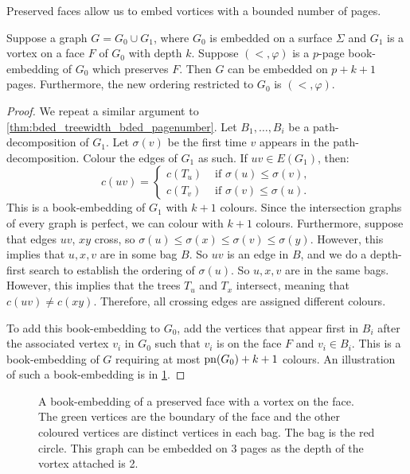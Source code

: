 Preserved faces allow us to embed vortices with a bounded number of pages. 

\begin{lemma}\label{lem:preserved_faces_pagenumber}
	Suppose a graph \(G = G_0 \cup G_1\), where \(G_0\) is embedded on a surface $\Sigma$ and \(G_1\) is a vortex on a face $F$ of $G_0$ with depth \(k\). Suppose $(<, \varphi)$ is a $p$-page book-embedding of \(G_0\) which preserves \(F\). Then $G$ can be embedded on \(p + k + 1\) pages. Furthermore, the new ordering restricted to $G_0$ is $(<, \varphi)$.
\end{lemma}

\begin{proof}
	We repeat a similar argument to \cref{thm:bded_treewidth_bded_pagenumber}. Let \(B_1, \ldots, B_i\) be a path-decomposition of \(G_1\). Let \(\sigma(v)\) be the first time \(v\) appears in the path-decomposition. Colour the edges of \(G_1\) as such. If \(uv \in E(G_1)\), then:
	\begin{equation}
		c(uv) =
		\begin{cases}
			c(T_u) & \text{ if } \sigma(u) \leq \sigma(v), \\
			c(T_v) & \text{ if } \sigma(v) \leq \sigma(u).
		\end{cases}
	\end{equation}
	This is a book-embedding of \(G_1\) with \(k+1\) colours. Since the intersection graphs of every graph is perfect, we can colour with $k + 1$ colours. Furthermore, suppose that edges \(uv\), \(xy\) cross, so \(\sigma(u) \leq \sigma(x) \leq \sigma(v) \leq \sigma(y)\). However, this implies that $u,x,v$ are in some bag $B$. So \(uv\) is an edge in \(B\), and we do a depth-first search to establish the ordering of $\sigma(u)$. So \(u, x, v\) are in the same bags. However, this implies that the trees \(T_u\) and \(T_x\) intersect, meaning that \(c(uv) \neq c(xy)\). Therefore, all crossing edges are assigned different colours. 

	To add this book-embedding to \(G_0\), add the vertices that appear first in \(B_i\) after the associated vertex \(v_i\) in \(G_0\) such that \(v_i\) is on the face \(F\) and \(v_i \in B_i\). This is a book-embedding of \(G\) requiring at most \(\operatorname{pn}(G_0) + k + 1\) colours. An illustration of such a book-embedding is in \cref{fig:preserved_face}.
\end{proof}

\begin{figure}[h!]
	\centering
	
	\caption[Book-embedding of a preserved face]{A book-embedding of a preserved face  with a vortex on the face. The green vertices are the boundary of the face and the other coloured vertices are distinct vertices in each bag. The bag is the red circle. This graph can be embedded on $3$ pages as the depth of the vortex attached is 2. }\label{fig:preserved_face}
\end{figure}

